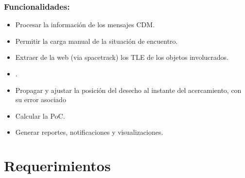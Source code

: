 \subsubsection*{Funcionalidades:}
\begin{itemize}
\item Procesar la informaci\'on de los mensajes CDM.\\
\item Permitir la carga manual de la situaci\'on de encuentro.\\
\item Extraer de la web (via spacetrack) los TLE de los objetos involucrados.\\
\item .\\
\item Propagar y ajustar la posici\'on del desecho al instante del acercamiento, con su error asociado\\
\item Calcular la PoC.\\
\item Generar reportes, notificaciones y visualizaciones.\\
\end{itemize}

\section{Requerimientos}

